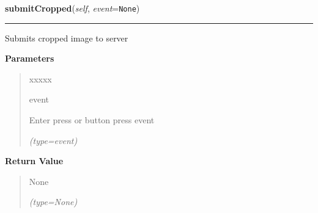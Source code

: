 \hspace{.8\funcindent}\begin{boxedminipage}{\funcwidth}

    \raggedright \textbf{submitCropped}(\textit{self}, \textit{event}={\tt None})

    \vspace{-1.5ex}

    \rule{\textwidth}{0.5\fboxrule}
\setlength{\parskip}{2ex}
    Submits cropped image to server

\setlength{\parskip}{1ex}
      \textbf{Parameters}
      \vspace{-1ex}

      \begin{quote}
        \begin{Ventry}{xxxxx}

          \item[event]

          Enter press or button press event

            {\it (type=event)}

        \end{Ventry}

      \end{quote}

      \textbf{Return Value}
    \vspace{-1ex}

      \begin{quote}
      None

      {\it (type=None)}

      \end{quote}

    \end{boxedminipage}

    \label{client_gui:GuiClass:nextCropped}

    \vspace{0.5ex}

